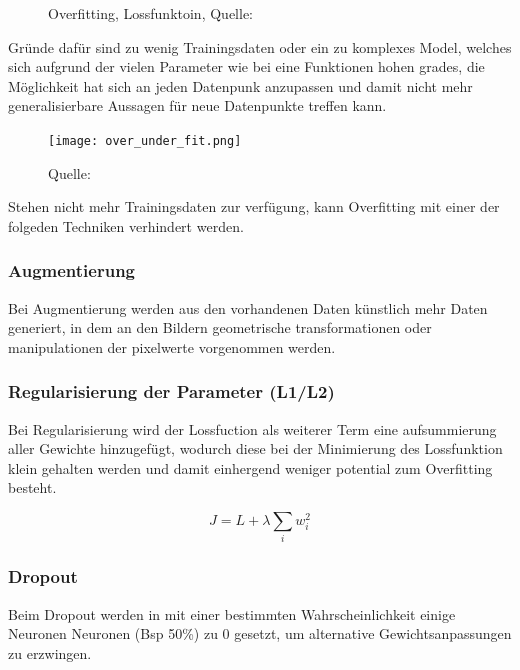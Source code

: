 \begin{figure}[H]
    \centering
    \def\svgwidth{0.5\textwidth}
    
    \caption{Overfitting, Lossfunktoin, Quelle: \cite{overfittingPlot}}
    \label{fig:overfitting}
\end{figure}

Gründe dafür sind zu wenig Trainingsdaten oder ein zu komplexes Model, 
welches sich aufgrund der vielen Parameter wie bei eine Funktionen hohen
grades, die Möglichkeit hat sich an jeden Datenpunk 
anzupassen und damit nicht mehr generalisierbare Aussagen 
für neue Datenpunkte treffen kann.


\begin{figure}[H]
    \centering
    \texttt{[image: over\_under\_fit.png]}
    \caption{Quelle: \cite{deshpGuideImprovingDeep2017a}}
    \label{fig:over_under_fit}
\end{figure}


Stehen nicht mehr Trainingsdaten zur verfügung, kann Overfitting
mit einer der folgeden Techniken verhindert werden.


\subsubsection{Augmentierung}
Bei Augmentierung werden aus den vorhandenen Daten künstlich mehr 
Daten generiert, in dem an den Bildern geometrische transformationen 
oder manipulationen der pixelwerte vorgenommen werden.

\subsubsection{Regularisierung der Parameter (L1/L2)}
Bei Regularisierung wird der Lossfuction als weiterer Term
eine aufsummierung aller Gewichte hinzugefügt,
wodurch diese bei der Minimierung des Lossfunktion 
klein gehalten werden und damit einhergend weniger potential 
zum Overfitting besteht.

\begin{equation}
    \label{eq:regularization}
    J = L + \lambda \sum_{i} w_{i}^{2}
\end{equation}

\subsubsection{Dropout}
Beim Dropout werden in mit einer bestimmten Wahrscheinlichkeit 
einige Neuronen Neuronen (Bsp 50\%) zu 0 gesetzt, um 
alternative Gewichtsanpassungen zu erzwingen.


